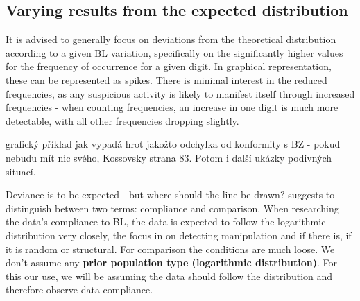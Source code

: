 \subsection{Varying results from the expected distribution}

It is advised to generally focus on deviations from the theoretical distribution according to a given BL variation, specifically on the significantly higher values for the frequency of occurrence for a given digit. In graphical representation, these can be represented as spikes. There is minimal interest in the reduced frequencies, as any suspicious activity is likely to manifest itself through increased frequencies - when counting frequencies, an increase in one digit is much more detectable, with all other frequencies dropping slightly. \cite{kossovsky2014benford} %

\begin{koment}
    grafický příklad jak vypadá hrot jakožto odchylka od konformity s BZ - pokud nebudu mít nic svého, Kossovsky strana 83. Potom i další ukázky podivných situací.
\end{koment}

Deviance is to be expected - but where should the line be drawn?  \citeauthor{kossovsky2014benford} suggests to distinguish between two terms: compliance and comparison. When researching the data's compliance to BL, the data is expected to follow the logarithmic distribution very closely, the focus in on detecting manipulation and if there is, if it is random or structural. For comparison the conditions are much loose. We don't assume any \textbf{prior population type (logarithmic distribution)}. For this our use, we will be assuming the data should follow the distribution and therefore observe data compliance.




